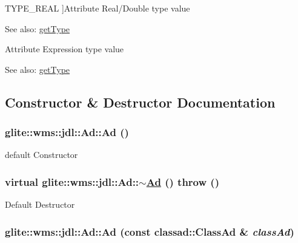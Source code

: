 \begin{Desc}
\begin{description}
{\hypertarget{classglite_1_1wms_1_1jdl_1_1Ad_z19_0w4}{
TYPE\_\-REAL}
\label{classglite_1_1wms_1_1jdl_1_1Ad_z19_0w4}
}]Attribute Real/Double type value \begin{Desc}
\item[See also:]\hyperlink{classglite_1_1wms_1_1jdl_1_1Ad_z19_1}{get\-Type} \end{Desc}
\item[{\em 
\hypertarget{classglite_1_1wms_1_1jdl_1_1Ad_z19_0w5}{
TYPE\_\-EXPRESSION}
\label{classglite_1_1wms_1_1jdl_1_1Ad_z19_0w5}
}]Attribute Expression type value \begin{Desc}
\item[See also:]\hyperlink{classglite_1_1wms_1_1jdl_1_1Ad_z19_1}{get\-Type} \end{Desc}
\end{description}
\end{Desc}



\subsection{Constructor \& Destructor Documentation}
\hypertarget{classglite_1_1wms_1_1jdl_1_1Ad_z11_0}{
\subsubsection[Ad]{\setlength{\rightskip}{0pt plus 5cm}glite::wms::jdl::Ad::Ad ()}}
\label{classglite_1_1wms_1_1jdl_1_1Ad_z11_0}


default Constructor \hypertarget{classglite_1_1wms_1_1jdl_1_1Ad_z11_1}{
\subsubsection[$\sim$Ad]{\setlength{\rightskip}{0pt plus 5cm}virtual glite::wms::jdl::Ad::$\sim$\hyperlink{classglite_1_1wms_1_1jdl_1_1Ad}{Ad} ()  throw ()}}
\label{classglite_1_1wms_1_1jdl_1_1Ad_z11_1}


Default Destructor \hypertarget{classglite_1_1wms_1_1jdl_1_1Ad_z11_2}{
\subsubsection[Ad]{\setlength{\rightskip}{0pt plus 5cm}glite::wms::jdl::Ad::Ad (const classad::Class\-Ad \& {\em class\-Ad})}}
\label{classglite_1_1wms_1_1jdl_1_1Ad_z11_2}


